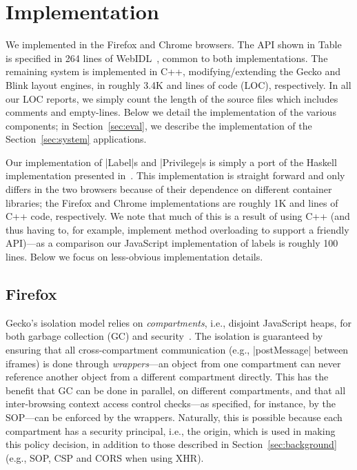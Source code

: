 \section{Implementation}
\label{sec:implementation}

We implemented \sys{} in the Firefox and Chrome browsers.
%
The API shown in Table~ is specified in 264
lines of WebIDL~\cite{webidl}, common to both
implementations.
%
The remaining system is implemented in C++, modifying/extending the Gecko and
Blink layout engines, in roughly 3.4K and  lines of code (LOC),
respectively.
%
In all our LOC reports, we simply count the length of the source files which
includes comments and empty-lines.
%
Below we detail the implementation of the various \sys{} components;
in Section~\ref{sec:eval}, we describe the implementation of the
Section~\ref{sec:system} applications.

%
Our implementation of \js|Label|s and \js|Privilege|s is simply a port
of the Haskell implementation presented
in~\cite{stefan:2011:dclabels,stefan:2011:flexible}. 
%
This implementation is straight forward and only differs in the two
browsers because of their dependence on different container libraries;
the Firefox and Chrome implementations are roughly 1K and 
lines of C++ code, respectively.
%
We note that much of this is a result of using C++ (and thus having
to, for example, implement method overloading to support a friendly
API)---as a comparison our JavaScript implementation of labels is
roughly 100 lines. 
%
Below we focus on less-obvious implementation details.
%

\subsection{Firefox}
\label{sec:implementation:firefox}

Gecko's isolation model relies on \emph{compartments}, i.e., disjoint
JavaScript heaps, for both garbage collection (GC) and
security~\cite{wagner2011compartmental}.
%
The isolation is guaranteed by ensuring that all cross-compartment
communication (e.g., \js|postMessage| between iframes) is done through
\emph{wrappers}---an object from one compartment can never reference
another object from a different compartment directly.
%
This has the benefit that GC can be done in parallel, on different compartments,
and that all inter-browsing context access control checks---as specified, for
instance, by the SOP---can be enforced by the wrappers.
%
Naturally, this is possible because each compartment has a security
principal, i.e., the origin, which is used in making this policy
decision, in addition to those described in
Section~\ref{sec:background} (e.g., SOP, CSP and CORS when using XHR).


